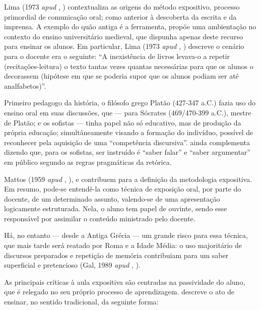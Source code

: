 Lima (1973 \textit{apud} \citeauthor{andreataAulaExpositivaPaulo2019}, \citeyear{andreataAulaExpositivaPaulo2019}) contextualiza as origens do método expositivo, processo primordial de comunicação oral; como anterior à descoberta da escrita e da imprensa. A exemplo do quão antiga é a ferramenta, propõe uma ambientação no contexto do ensino universitário medieval, que dispunha apenas deste recurso para ensinar os alunos. Em particular, Lima (1973 \textit{apud} \citeauthor{andreataAulaExpositivaPaulo2019}, \citeyear{andreataAulaExpositivaPaulo2019}) descreve o cenário para o docente era o seguinte: ``A inexistência de livros levava-o a repetir (recitações-leitura) o texto tantas vezes quantas necessárias para que os alunos o decorassem (hipótese em que se poderia supor que os alunos podiam ser até analfabetos)''.


Primeiro pedagogo da história, o filósofo grego Platão (427-347 a.C.) fazia uso do ensino oral em suas discussões, que --- para Sócrates (469/470-399 a.C.), mestre de Platão; e os sofistas --- tinha papel não só educativo, mas de produção da própria educação; simultâneamente visando a formação do indivíduo, possível de reconhecer pela aquisição de uma ``competência discursiva''.  ainda complementa dizendo que, para os sofistas, ser instruído é ``saber falar'' e ``saber argumentar'' em público segundo as regras pragmáticas da retórica.

Mattos (1959 \textit{apud} \citeauthor{andreataAulaExpositivaPaulo2019}, \citeyear{andreataAulaExpositivaPaulo2019}),  e  contribuem para a definição da metodologia expositiva. Em resumo, pode-se entendê-la como técnica de exposição oral, por parte do docente, de um determinado assunto, valendo-se de uma apresentação logicamente estruturada. Nela, o aluno tem papel de ouvinte, sendo esse responsável por assimilar o conteúdo ministrado pelo docente.

Há, no entanto --- desde a Antiga Grécia --- um grande risco para essa técnica, que mais tarde será reatado por Roma e a Idade Média: o uso majoritário de discursos preparados e repetição de memória contribuiam para um saber superficial e pretencioso (Gal, 1989 \textit{apud} \citeauthor{andreataAulaExpositivaPaulo2019}, \citeyear{andreataAulaExpositivaPaulo2019}).

As principais críticas à aula expositiva são centradas na passividade do aluno, que é relegado no seu próprio processo de aprendizagem.  descreve o ato de ensinar, no sentido tradicional, da seguinte forma:

